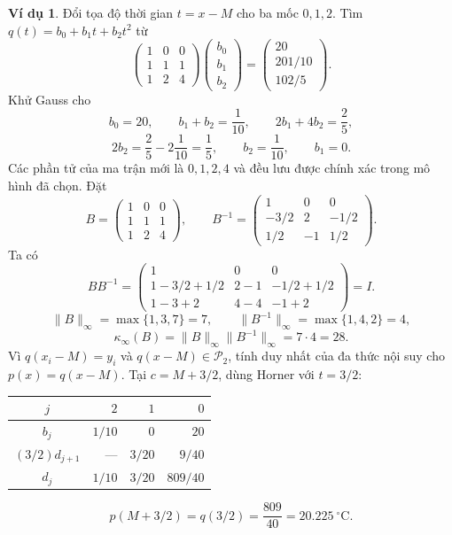 \documentclass[12pt,a4paper,oneside]{book}
\numberwithin{algorithm}{chapter}
\theoremstyle{definition}
\newtheorem{vidu}{Ví dụ}[chapter]
\begin{document}
\begin{vidu}
Đổi tọa độ thời gian $t=x-M$ cho ba mốc $0,1,2$. Tìm $q(t)=b_0+b_1t+b_2t^2$ từ
\[
 \begin{pmatrix}1&0&0\\1&1&1\\1&2&4\end{pmatrix}
 \begin{pmatrix}b_0\\b_1\\b_2\end{pmatrix}
 =\begin{pmatrix}20\\201/10\\102/5\end{pmatrix}.
\]
Khử Gauss cho
\[
 b_0=20,\qquad b_1+b_2=\frac1{10},\qquad
 2b_1+4b_2=\frac25,
\]
\[
 2b_2=\frac25-2\frac1{10}=\frac15,
 \qquad b_2=\frac1{10},\qquad b_1=0.
\]
Các phần tử của ma trận mới là $0,1,2,4$ và đều lưu được chính xác trong mô hình đã chọn. Đặt
\[
 B=\begin{pmatrix}1&0&0\\1&1&1\\1&2&4\end{pmatrix},\qquad
 B^{-1}=\begin{pmatrix}1&0&0\\-3/2&2&-1/2\\1/2&-1&1/2\end{pmatrix}.
\]
Ta có
\[
 BB^{-1}
 =\begin{pmatrix}
 1&0&0\\
 1-3/2+1/2&2-1&-1/2+1/2\\
 1-3+2&4-4&-1+2
\end{pmatrix}=I.
\]
\[
 \|B\|_\infty=\max\{1,3,7\}=7,
 \qquad\|B^{-1}\|_\infty=\max\{1,4,2\}=4,
\]
\[
 \kappa_\infty(B)=\|B\|_\infty\|B^{-1}\|_\infty=7\cdot4=28.
\]
Vì $q(x_i-M)=y_i$ và $q(x-M)\in\mathcal P_2$, tính duy nhất của đa thức nội suy cho $p(x)=q(x-M)$. Tại $c=M+3/2$, dùng Horner với $t=3/2$:
\begin{center}
\begin{tabular}{c|rrr}
\toprule
$j$ & $2$ & $1$ & $0$\\
\midrule
$b_j$ & $1/10$ & $0$ & $20$\\
$(3/2)d_{j+1}$ & --- & $3/20$ & $9/40$\\
\midrule
$d_j$ & $1/10$ & $3/20$ & $\boxed{809/40}$\\
\bottomrule
\end{tabular}
\end{center}
\[
 p(M+3/2)=q(3/2)=\frac{809}{40}=20.225\ {}^{\circ}\mathrm C.
\]
\end{vidu}
\end{document}
